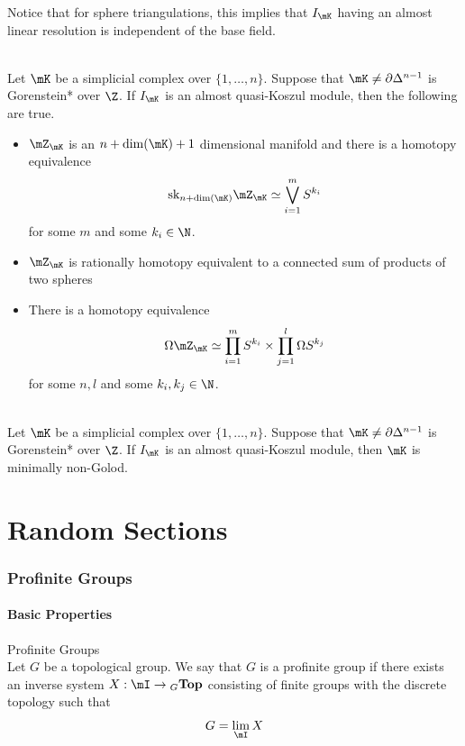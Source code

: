 \documentclass[a4paper]{article}
\begin{document}
Notice that for sphere triangulations, this implies that $I_\mK$ having an almost linear resolution is independent of the base field. 

\begin{thm}{}{}\\
Let $\mK$ be a simplicial complex over $\{1,\dots,n\}$. Suppose that $\mK\neq\partial\Delta^{n-1}$ is Gorenstein* over $\Z$. If $I_\mK$ is an almost quasi-Koszul module, then the following are true. 
\begin{itemize}
\item $\mZ_\mK$ is an $n+\dim(\mK)+1$ dimensional manifold and there is a homotopy equivalence $$\text{sk}_{n+\dim(\mK)}\mZ_\mK\simeq\bigvee_{i=1}^mS^{k_i}$$ for some $m$ and some $k_i\in\N$. 
\item $\mZ_\mK$ is rationally homotopy equivalent to a connected sum of products of two spheres 
\item There is a homotopy equivalence $$\Omega\mZ_\mK\simeq\prod_{i=1}^mS^{k_i}\times\prod_{j=1}^l\Omega S^{k_j}$$ for some $n,l$ and some $k_i,k_j\in\N$. 
\end{itemize}
\end{thm}

\begin{crl}{}{}\\
Let $\mK$ be a simplicial complex over $\{1,\dots,n\}$. Suppose that $\mK\neq\partial\Delta^{n-1}$ is Gorenstein* over $\Z$. If $I_\mK$ is an almost quasi-Koszul module, then $\mK$ is minimally non-Golod. 
\end{crl}

\pagebreak
\part{Random Sections}
\section{Profinite Groups}
\subsection{Basic Properties}
\begin{defn}{Profinite Groups}{}\\
Let $G$ be a topological group. We say that $G$ is a profinite group if there exists an inverse system $X:\mI\to{_G}\bold{Top}$ consisting of finite groups with the discrete topology such that $$G=\lim_\mI X$$
\end{defn}
\end{document}
